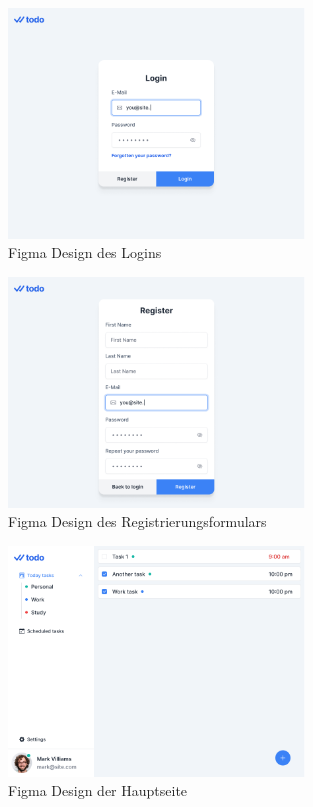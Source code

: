 \documentclass[a4paper, 12pt]{article}
\begin{document}
    \begin{figure}[H]
        \center\includegraphics[width=0.7\textwidth]{../images/figma/login}
        \caption{Figma Design des Logins}\label{fig:figure}
    \end{figure}

    \begin{figure}[H]
        \center\includegraphics[width=0.7\textwidth]{../images/figma/register}
        \caption{Figma Design des Registrierungsformulars}\label{fig:figure}
    \end{figure}

    \begin{figure}[H]
        \center\includegraphics[width=0.7\textwidth]{../images/figma/main}
        \caption{Figma Design der Hauptseite}\label{fig:figure}
    \end{figure}
\end{document}
